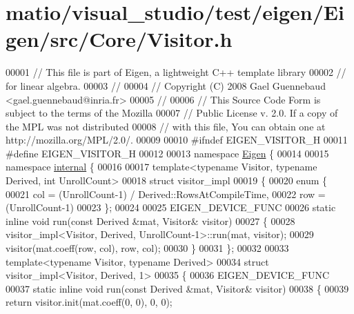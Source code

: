 \hypertarget{matio_2visual__studio_2test_2eigen_2_eigen_2src_2_core_2_visitor_8h_source}{}\section{matio/visual\+\_\+studio/test/eigen/\+Eigen/src/\+Core/\+Visitor.h}
\label{matio_2visual__studio_2test_2eigen_2_eigen_2src_2_core_2_visitor_8h_source}

\begin{DoxyCode}
00001 \textcolor{comment}{// This file is part of Eigen, a lightweight C++ template library}
00002 \textcolor{comment}{// for linear algebra.}
00003 \textcolor{comment}{//}
00004 \textcolor{comment}{// Copyright (C) 2008 Gael Guennebaud <gael.guennebaud@inria.fr>}
00005 \textcolor{comment}{//}
00006 \textcolor{comment}{// This Source Code Form is subject to the terms of the Mozilla}
00007 \textcolor{comment}{// Public License v. 2.0. If a copy of the MPL was not distributed}
00008 \textcolor{comment}{// with this file, You can obtain one at http://mozilla.org/MPL/2.0/.}
00009 
00010 \textcolor{preprocessor}{#ifndef EIGEN\_VISITOR\_H}
00011 \textcolor{preprocessor}{#define EIGEN\_VISITOR\_H}
00012 
00013 \textcolor{keyword}{namespace }\hyperlink{namespace_eigen}{Eigen} \{ 
00014 
00015 \textcolor{keyword}{namespace }\hyperlink{namespaceinternal}{internal} \{
00016 
00017 \textcolor{keyword}{template}<\textcolor{keyword}{typename} Visitor, \textcolor{keyword}{typename} Derived, \textcolor{keywordtype}{int} UnrollCount>
00018 \textcolor{keyword}{struct }visitor\_impl
00019 \{
00020   \textcolor{keyword}{enum} \{
00021     col = (UnrollCount-1) / Derived::RowsAtCompileTime,
00022     row = (UnrollCount-1) %
00023   \};
00024 
00025   EIGEN\_DEVICE\_FUNC
00026   \textcolor{keyword}{static} \textcolor{keyword}{inline} \textcolor{keywordtype}{void} run(\textcolor{keyword}{const} Derived &mat, Visitor& visitor)
00027   \{
00028     visitor\_impl<Visitor, Derived, UnrollCount-1>::run(mat, visitor);
00029     visitor(mat.coeff(row, col), row, col);
00030   \}
00031 \};
00032 
00033 \textcolor{keyword}{template}<\textcolor{keyword}{typename} Visitor, \textcolor{keyword}{typename} Derived>
00034 \textcolor{keyword}{struct }visitor\_impl<Visitor, Derived, 1>
00035 \{
00036   EIGEN\_DEVICE\_FUNC
00037   \textcolor{keyword}{static} \textcolor{keyword}{inline} \textcolor{keywordtype}{void} run(\textcolor{keyword}{const} Derived &mat, Visitor& visitor)
00038   \{
00039     \textcolor{keywordflow}{return} visitor.init(mat.coeff(0, 0), 0, 0);

\end{DoxyCode}
